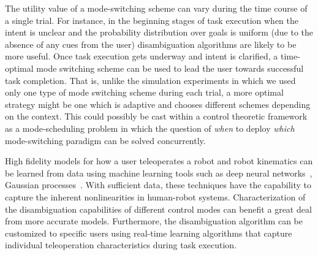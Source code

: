 \documentclass[conference]{IEEEtran}
\begin{document}
The utility value of a mode-switching scheme can vary during the time course of a single trial. For instance, in the beginning stages of task execution when the intent is unclear and the probability distribution over goals is uniform (due to the absence of any cues from the user) disambiguation algorithms are likely to be more useful. Once task execution gets underway and intent is clarified, a time-optimal mode switching scheme can be used to lead the user towards successful task completion. That is, unlike the simulation experiments in which we used only one type of mode switching scheme during each trial, a more optimal strategy might be one which is adaptive and chooses different schemes depending on the context. This could possibly be cast within a control theoretic framework as a mode-scheduling problem in which the question of \textit{when} to deploy \textit{which} mode-switching paradigm can be solved concurrently. 

High fidelity models for how a user teleoperates a robot and robot kinematics can be learned from data using machine learning tools such as deep neural networks~\citep{nagabandi2017neural}, Gaussian processes~\citep{wang2013probabilistic}. With sufficient data, these techniques have the capability to capture the inherent nonlinearities in human-robot systems. Characterization of the disambiguation capabilities of different control modes can benefit a great deal from more accurate models. Furthermore, the disambiguation algorithm can be customized to specific users using real-time learning algorithms that capture individual teleoperation characteristics during task execution. 



\end{document}
